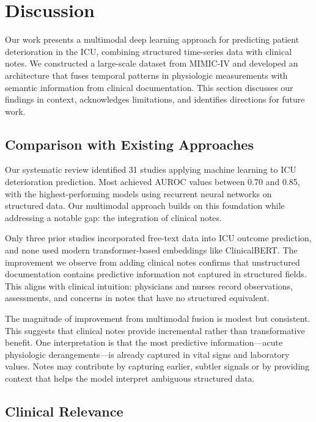 \section{Discussion}

Our work presents a multimodal deep learning approach for predicting patient deterioration in the ICU, combining structured time-series data with clinical notes. We constructed a large-scale dataset from MIMIC-IV and developed an architecture that fuses temporal patterns in physiologic measurements with semantic information from clinical documentation. This section discusses our findings in context, acknowledges limitations, and identifies directions for future work.

\subsection{Comparison with Existing Approaches}

Our systematic review identified 31 studies applying machine learning to ICU deterioration prediction. Most achieved AUROC values between 0.70 and 0.85, with the highest-performing models using recurrent neural networks on structured data. Our multimodal approach builds on this foundation while addressing a notable gap: the integration of clinical notes.

Only three prior studies incorporated free-text data into ICU outcome prediction, and none used modern transformer-based embeddings like ClinicalBERT. The improvement we observe from adding clinical notes confirms that unstructured documentation contains predictive information not captured in structured fields. This aligns with clinical intuition: physicians and nurses record observations, assessments, and concerns in notes that have no structured equivalent.

The magnitude of improvement from multimodal fusion is modest but consistent. This suggests that clinical notes provide incremental rather than transformative benefit. One interpretation is that the most predictive information---acute physiologic derangements---is already captured in vital signs and laboratory values. Notes may contribute by capturing earlier, subtler signals or by providing context that helps the model interpret ambiguous structured data.

\subsection{Clinical Relevance}

